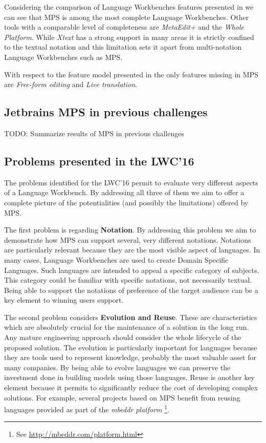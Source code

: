 \documentclass[preprint,numbers,10pt]{sigplanconf}
\begin{document}
Considering the comparison of Language Workbenches features presented in \cite{erdweg2015evaluating} we can see that MPS is among the most complete Language Workbenches. Other tools with a comparable level of completeness are \emph{MetaEdit+} and the \emph{Whole Platform}. While \emph{Xtext} \cite{Eysholdt2010} has a strong support in many areas it is strictly confined to the textual notation and this limitation sets it apart from multi-notation Language Workbenches such as MPS.

With respect to the feature model presented in \cite{erdweg2015evaluating} the only features missing in MPS are \emph{Free-form editing} and \emph{Live translation}.

\subsection{Jetbrains MPS in previous challenges}

TODO: Summarize results of MPS in previous challenges

\subsection{Problems presented in the LWC'16}

The problems identified for the LWC'16 permit to evaluate very different aspects of a Language Workbench. By addressing all three of them we aim to offer a complete picture of the potentialities (and possibly the limitations) offered by MPS.

The first problem is regarding \textbf{Notation}. By addressing this problem we aim to demonstrate how MPS can support several, very different notations. Notations are particularly relevant because they are the most visible aspect of languages. In many cases, Language Workbenches are used to create Domain Specific Languages. Such languages are intended to appeal a specific category of subjects. This category could be familiar with specific notations, not necessarily textual. Being able to support the notations of preference of the target audience can be a key element to winning users support. 

The second problem considers \textbf{Evolution and Reuse}. These are characteristics which are absolutely crucial for the maintenance of a solution in the long run. Any mature engineering approach should consider the whole lifecycle of the proposed solution. The evolution is particularly important for languages because they are tools used to represent knowledge, probably the most valuable asset for many companies. By being able to evolve languages we can preserve the investment done in building models using those languages. Reuse is another key element because it permits to significantly reduce the cost of developing complex solutions. For example, several projects based on MPS benefit from reusing languages provided as part of the \emph{mbeddr platform} \footnote{See \url{http://mbeddr.com/platform.html}}.
\end{document}
